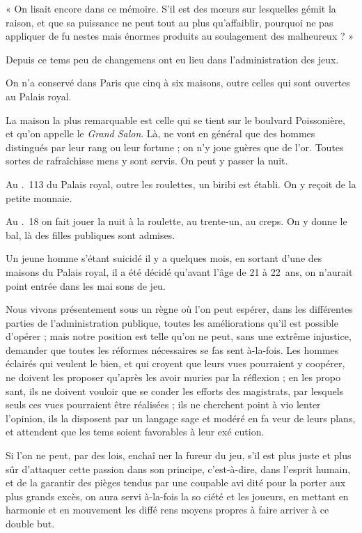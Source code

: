 « On lisait encore dans ce mémoire.
S'il est des m{\oe}urs sur lesquelles
gémit la raison, et que sa puissance
ne peut tout au plus qu'affaiblir,
pourquoi ne pas appliquer de fu%
nestes mais énormes produits au 
soulagement des malheureux ? »

Depuis ce tems peu de changemens
ont eu lieu dans l'administration des
jeux.

On n'a conservé dans Paris que cinq
à six maisons, outre celles qui sont
ouvertes au Palais royal.

La maison la plus remarquable est
celle qui se tient sur le boulvard
Poissonière, et qu'on appelle le \emph{Grand
Salon}. Là, ne vont en général que des
hommes distingués par leur rang ou
leur fortune ; on n'y joue guères que
de l'or. Toutes sortes de rafraîchisse%
mens y sont servis. On peut y passer
la nuit.

Au \no.~113 du Palais royal, outre
les roulettes, un biribi est établi. On
y reçoit de la petite monnaie.

Au \no.~18 on fait jouer la nuit à la
roulette, au trente-un, au creps. On
y donne le bal, là des filles publiques
sont admises.

Un jeune homme s'étant suicidé il
y a quelques mois, en sortant d'une
des maisons du Palais royal, il a été
décidé qu'avant l'âge de 21 à 22~ans,
on n'aurait point entrée dans les mai%
sons de jeu.

Nous vivons présentement sous un
règne où l'on peut espérer, dans les
différentes parties de l'administration
publique, toutes les améliorations
qu'il est possible d'opérer ; mais notre
position est telle qu'on ne peut, sans
une extrême injustice, demander que
toutes les réformes nécessaires se fas%
sent à-la-fois. Les hommes éclairés qui
veulent le bien, et qui croyent que
leurs vues pourraient y coopérer, ne
doivent les proposer qu'après les avoir
muries par la réflexion ; en les propo%
sant, ils ne doivent vouloir que se%
conder les efforts des magistrats, par
lesquels seuls ces vues pourraient être
réalisées ; ils ne cherchent point à vio%
lenter l'opinion, ils la disposent par
un langage sage et modéré en fa%
veur de leurs plans, et attendent que
les tems soient favorables à leur exé%
cution.

Si l'on ne peut, par des lois, enchaî%
ner la fureur du jeu, s'il est plus juste
et plus sûr d'attaquer cette passion
dans son principe, c'est-à-dire, dans
l'esprit humain, et de la garantir des
pièges tendus par une coupable avi%
dité pour la porter aux plus grands
excès, on aura servi à-la-fois la so%
ciété et les joueurs, en mettant en
harmonie et en mouvement les diffé%
rens moyens propres à faire arriver à
ce double but.

